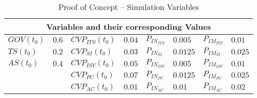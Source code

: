 \begin{table}[t]
	\centering
	\begin{tabular}{llllllll}
		\toprule 
		\multicolumn{8}{c}{\footnotesize \textbf{Variables and their corresponding Values}} \\ \midrule
		\footnotesize $GOV(t_0)$ & \footnotesize $0.6$ & \footnotesize $CVP_{ITS}(t_0)$ & \footnotesize $0.04$ & \footnotesize $P_{IN_{ITS}}$ & \footnotesize $0.005$ & \footnotesize $P_{IM_{ITS}}$ & \footnotesize $0.01$ \\
		\footnotesize $TS(t_0)$ & \footnotesize $0.2$ & \footnotesize $CVP_{SI}(t_0)$ & \footnotesize $0.03$ & \footnotesize $P_{IN_{SI}}$ & \footnotesize $0.0125$ & \footnotesize $P_{IM_{SI}}$ & \footnotesize $0.025$ \\
		\footnotesize $AS(t_0)$ & \footnotesize $0.4$ & \footnotesize $CVP_{ISV}(t_0)$ & \footnotesize $0.05$ & \footnotesize $P_{IN_{ISV}}$ & \footnotesize $0.005$ & \footnotesize $P_{IM_{ISV}}$ & \footnotesize $0.01$ \\
		& & \footnotesize $CVP_{PC}(t_0)$ & \footnotesize $0.07$ & \footnotesize $P_{IN_{PC}}$ & \footnotesize $0.0125$ & \footnotesize $P_{IM_{PC}}$ & \footnotesize $0.025$ \\
		& & \footnotesize $CVP_{AC}(t_0)$ & \footnotesize $0.01$ & \footnotesize $P_{IN_{AC}}$ & \footnotesize $0.01$ & \footnotesize $P_{IM_{AC}}$ & \footnotesize $0.02$ \\ \bottomrule
	\end{tabular}
	\caption{Proof of Concept -- Simulation Variables}
	\label{tab:mvar:sap}
\end{table}


